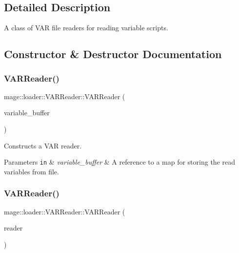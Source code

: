 \subsection{Detailed Description}
A class of V\+AR file readers for reading variable scripts. 

\subsection{Constructor \& Destructor Documentation}
\hypertarget{classmage_1_1loader_1_1_v_a_r_reader_ae06b2b97d9a0ce16047b0c8cfcd4a73f}{}\label{classmage_1_1loader_1_1_v_a_r_reader_ae06b2b97d9a0ce16047b0c8cfcd4a73f} 
\subsubsection{\texorpdfstring{V\+A\+R\+Reader()}{VARReader()}\hspace{0.1cm}{\footnotesize\ttfamily [1/3]}}
{\footnotesize\ttfamily mage\+::loader\+::\+V\+A\+R\+Reader\+::\+V\+A\+R\+Reader (\begin{DoxyParamCaption}\item[{std\+::map$<$ string, \hyperlink{namespacemage_aa1fe0628487e0706e44efdc62dbdb3a2}{Value} $>$ \&}]{variable\+\_\+buffer }\end{DoxyParamCaption})\hspace{0.3cm}{\ttfamily [explicit]}}

Constructs a V\+AR reader.


\begin{DoxyParams}[1]{Parameters}
\mbox{\tt in}  & {\em variable\+\_\+buffer} & A reference to a map for storing the read variables from file. \\
\hline
\end{DoxyParams}
\hypertarget{classmage_1_1loader_1_1_v_a_r_reader_ab4ab4d94c90a2797ae40e54e0dd7c127}{}\label{classmage_1_1loader_1_1_v_a_r_reader_ab4ab4d94c90a2797ae40e54e0dd7c127} 
\subsubsection{\texorpdfstring{V\+A\+R\+Reader()}{VARReader()}\hspace{0.1cm}{\footnotesize\ttfamily [2/3]}}
{\footnotesize\ttfamily mage\+::loader\+::\+V\+A\+R\+Reader\+::\+V\+A\+R\+Reader (\begin{DoxyParamCaption}\item[{const \hyperlink{classmage_1_1loader_1_1_v_a_r_reader}{V\+A\+R\+Reader} \&}]{reader }\end{DoxyParamCaption})\hspace{0.3cm}{\ttfamily [delete]}}

